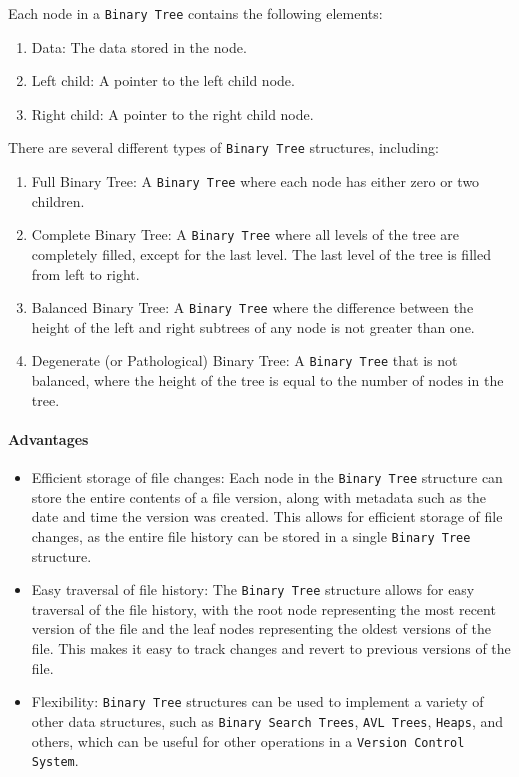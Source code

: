 Each node in a \lstinline{Binary Tree} contains the following elements:
\begin{enumerate}
    \item Data: The data stored in the node.
    \item Left child: A pointer to the left child node.
    \item Right child: A pointer to the right child node.
\end{enumerate}

There are several different types of \lstinline{Binary Tree} structures, including:
\begin{enumerate}
    \item Full Binary Tree: A \lstinline{Binary Tree} where each node has either zero or two children.
    \item Complete Binary Tree: A \lstinline{Binary Tree} where all levels of the tree are completely filled, except for the last level. The last level of the tree is filled from left to right.
    \item Balanced Binary Tree: A \lstinline{Binary Tree} where the difference between the height of the left and right subtrees of any node is not greater than one.
    \item Degenerate (or Pathological) Binary Tree: A \lstinline{Binary Tree} that is not balanced, where the height of the tree is equal to the number of nodes in the tree.
\end{enumerate}




\paragraph{Advantages}
\begin{itemize}
    \item Efficient storage of file changes: Each node in the \lstinline{Binary Tree} structure can store the entire contents of a file version, along with metadata such as the date and time the version was created. This allows for efficient storage of file changes, as the entire file history can be stored in a single \lstinline{Binary Tree} structure.
    \item Easy traversal of file history: The \lstinline{Binary Tree} structure allows for easy traversal of the file history, with the root node representing the most recent version of the file and the leaf nodes representing the oldest versions of the file. This makes it easy to track changes and revert to previous versions of the file.
    \item Flexibility: \lstinline{Binary Tree} structures can be used to implement a variety of other data structures, such as \lstinline{Binary Search Trees}, \lstinline{AVL Trees}, \lstinline{Heaps}, and others, which can be useful for other operations in a \lstinline{Version Control System}.
\end{itemize}
